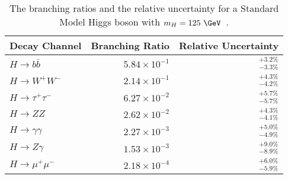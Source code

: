 \begin{table}[htpb]
 \centering
 \caption[The branching ratios and the relative uncertainty for a Standard Model Higgs boson with $m_{H}=125~\GeV$.]{%
  The branching ratios and the relative uncertainty for a Standard Model Higgs boson with $m_{H}=125~\GeV$~\cite{PDG2018:Ch11}.}
 \begin{tabular}{@{}lrr@{}} \toprule
  Decay Channel           & Branching Ratio       & Relative Uncertainty \\ \midrule
  $H\to b\bar{b}$         & $5.84 \times 10^{-1}$ & $_{-3.3\%}^{+3.2\%}$ \\
  \addlinespace[0.3em]
  $H\to W^{+}W^{-}$       & $2.14 \times 10^{-1}$ & $_{-4.2\%}^{+4.3\%}$ \\
  \addlinespace[0.3em]
  $H\to \tau^{+}\tau^{-}$ & $6.27 \times 10^{-2}$ & $_{-5.7\%}^{+5.7\%}$ \\
  \addlinespace[0.3em]
  $H\to ZZ$               & $2.62 \times 10^{-2}$ & $_{-4.1\%}^{+4.3\%}$ \\
  \addlinespace[0.3em]
  $H\to \gamma\gamma$     & $2.27 \times 10^{-3}$ & $_{-4.9\%}^{+5.0\%}$ \\
  \addlinespace[0.3em]
  $H\to Z\gamma$          & $1.53 \times 10^{-3}$ & $_{-8.9\%}^{+9.0\%}$ \\
  \addlinespace[0.3em]
  $H\to \mu^{+}\mu^{-}$   & $2.18 \times 10^{-4}$ & $_{-5.9\%}^{+6.0\%}$ \\
  \bottomrule
 \end{tabular}\label{table:Higgs_branchingratios}%
\end{table} 
